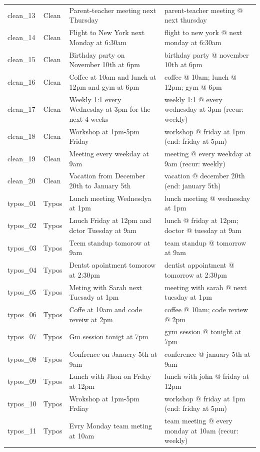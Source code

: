 \begin{longtable}{@{}p{2.2cm}p{2.1cm}p{5cm}p{5cm}@{}}
clean\_13 & Clean & Parent-teacher meeting next Thursday & parent-teacher meeting @ next thursday \\
clean\_14 & Clean & Flight to New York next Monday at 6:30am & flight to new york @ next monday at 6:30am \\
clean\_15 & Clean & Birthday party on November 10th at 6pm & birthday party @ november 10th at 6pm \\
clean\_16 & Clean & Coffee at 10am and lunch at 12pm and gym at 6pm & coffee @ 10am; lunch @ 12pm; gym @ 6pm \\
clean\_17 & Clean & Weekly 1:1 every Wednesday at 3pm for the next 4 weeks & weekly 1:1 @ every wednesday at 3pm (recur: weekly) \\
clean\_18 & Clean & Workshop at 1pm-5pm Friday & workshop @ friday at 1pm (end: friday at 5pm) \\
clean\_19 & Clean & Meeting every weekday at 9am & meeting @ every weekday at 9am (recur: weekly) \\
clean\_20 & Clean & Vacation from December 20th to January 5th & vacation @ december 20th (end: january 5th) \\
typos\_01 & Typos & Lunch meeting Wednesdya at 1pm & lunch meeting @ wednesday at 1pm \\
typos\_02 & Typos & Lnuch Friday at 12pm and dctor Tuesday at 9am & lunch @ friday at 12pm; doctor @ tuesday at 9am \\
typos\_03 & Typos & Teem standup tomorow at 9am & team standup @ tomorrow at 9am \\
typos\_04 & Typos & Dentst apointment tomorow at 2:30pm & dentist appointment @ tomorrow at 2:30pm \\
typos\_05 & Typos & Meting with Sarah next Tuesady at 1pm & meeting with sarah @ next tuesday at 1pm \\
typos\_06 & Typos & Coffe at 10am and code reveiw at 2pm & coffee @ 10am; code review @ 2pm \\
typos\_07 & Typos & Gm session tonigt at 7pm & gym session @ tonight at 7pm \\
typos\_08 & Typos & Confrence on Januery 5th at 9am & conference @ january 5th at 9am \\
typos\_09 & Typos & Lunch with Jhon on Frday at 12pm & lunch with john @ friday at 12pm \\
typos\_10 & Typos & Wrokshop at 1pm-5pm Frdiay & workshop @ friday at 1pm (end: friday at 5pm) \\
typos\_11 & Typos & Evry Monday team meting at 10am & team meeting @ every monday at 10am (recur: weekly) \\

\end{longtable}

